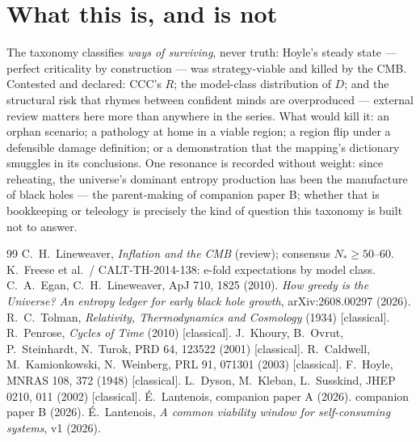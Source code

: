 \documentclass[11pt]{article}
\begin{document}
\section{What this is, and is not}
The taxonomy classifies \emph{ways of surviving}, never truth: Hoyle's steady state --- perfect
criticality by construction --- was strategy-viable and killed by the CMB. Contested and
declared: CCC's $R$; the model-class distribution of $D$; and the structural risk that rhymes
between confident minds are overproduced --- external review matters here more than anywhere in
the series. What would kill it: an orphan scenario; a pathology at home in a viable region; a
region flip under a defensible damage definition; or a demonstration that the mapping's
dictionary smuggles in its conclusions. One resonance is recorded without weight: since
reheating, the universe's dominant entropy production has been the manufacture of black holes
\cite{EL2010,Greedy} --- the parent-making of companion paper B; whether that is bookkeeping or
teleology is precisely the kind of question this taxonomy is built not to answer.

\begin{thebibliography}{99}\small
{} C.\ H.\ Lineweaver, \emph{Inflation and the CMB} (review); consensus $N_* \ge 50$--$60$.
 K.\ Freese et al.\ / CALT-TH-2014-138: e-fold expectations by model class.
 C.\ A.\ Egan, C.\ H.\ Lineweaver, ApJ 710, 1825 (2010).
 \emph{How greedy is the Universe? An entropy ledger for early black hole growth}, arXiv:2608.00297 (2026).
 R.\ C.\ Tolman, \emph{Relativity, Thermodynamics and Cosmology} (1934) [classical].
 R.\ Penrose, \emph{Cycles of Time} (2010) [classical].
 J.\ Khoury, B.\ Ovrut, P.\ Steinhardt, N.\ Turok, PRD 64, 123522 (2001) [classical].
 R.\ Caldwell, M.\ Kamionkowski, N.\ Weinberg, PRL 91, 071301 (2003) [classical].
 F.\ Hoyle, MNRAS 108, 372 (1948) [classical].
 L.\ Dyson, M.\ Kleban, L.\ Susskind, JHEP 0210, 011 (2002) [classical].
 \'E.\ Lantenois, companion paper A (2026).  companion paper B (2026).
 \'E.\ Lantenois, \emph{A common viability window for self-consuming systems}, v1 (2026).
\end{thebibliography}
\end{document}
